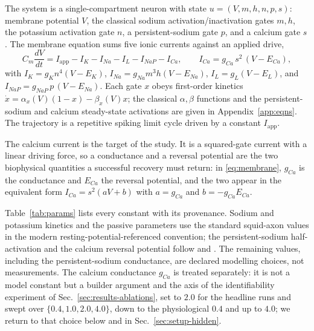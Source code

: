 \documentclass{article}
\newcommand{\gcaMain}{2.0}     %
\newcommand{\gcaPhys}{0.4}     %
\newcommand{\gcaMid}{1.0}      %
\newcommand{\gcaHi}{4.0}       %
\begin{document}
The system is a single-compartment neuron with state
$u = (V, m, h, n, p, s)$: membrane potential $V$, the classical sodium
activation/inactivation gates $m, h$, the potassium activation gate $n$, a
persistent-sodium gate $p$, and a calcium gate $s$. The membrane equation sums
five ionic currents against an applied drive,
\begin{equation}
C_m \frac{dV}{dt} = I_{\mathrm{app}} - I_K - I_{Na} - I_L - I_{NaP} - I_{Ca},
\qquad
I_{Ca} = g_{Ca}\, s^2\, (V - E_{Ca}),
\label{eq:membrane}
\end{equation}
with $I_K = g_K n^4 (V-E_K)$, $I_{Na} = g_{Na} m^3 h (V-E_{Na})$,
$I_L = g_L(V-E_L)$, and $I_{NaP} = g_{NaP}\, p\, (V-E_{Na})$. Each gate $x$ obeys
first-order kinetics $\dot{x} = \alpha_x(V)(1-x) - \beta_x(V)x$; the classical
$\alpha,\beta$ functions and the persistent-sodium and calcium steady-state
activations are given in Appendix~\ref{app:eqns}. The trajectory is a repetitive
spiking limit cycle driven by a constant $I_{\mathrm{app}}$.

The calcium current is the target of the study. It is a squared-gate current with
a linear driving force, so a conductance and a reversal potential are the two
biophysical quantities a successful recovery must return: in \eqref{eq:membrane},
$g_{Ca}$ is the conductance and $E_{Ca}$ the reversal potential, and the two
appear in the equivalent form $I_{Ca} = s^2(aV+b)$ with $a=g_{Ca}$ and
$b=-g_{Ca}E_{Ca}$.

Table~\ref{tab:params} lists every constant with its provenance. Sodium and
potassium kinetics and the passive parameters use the standard squid-axon values
\citep{hodgkin1952} in the modern resting-potential-referenced convention; the
persistent-sodium half-activation and the calcium reversal potential follow
\citet{magistretti1999} and \citet{reuveni1993}. The remaining values, including
the persistent-sodium conductance, are declared modelling choices, not
measurements. The calcium conductance $g_{Ca}$ is treated separately: it is not a
model constant but a builder argument and the axis of the identifiability
experiment of Sec.~\ref{sec:results-ablations}, set to $\gcaMain$ for the
headline runs and swept over $\{\gcaPhys,\gcaMid,\gcaMain,\gcaHi\}$, down to the
physiological $\gcaPhys$ and up to $\gcaHi$; we return to that
choice below and in Sec.~\ref{sec:setup-hidden}.
\end{document}
